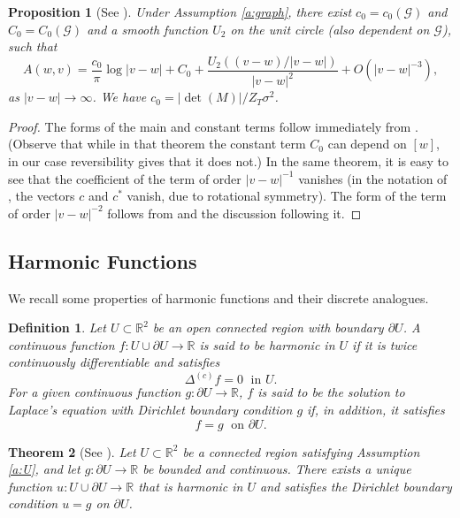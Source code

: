 \documentclass[11pt]{article}
\newtheorem{theorem}{Theorem}[section]
\newtheorem{proposition}[theorem]{Proposition}
\newtheorem{definition}{Definition}[section]
\theoremstyle{remark}
\def\cG{\mathcal{G}}
\newcommand{\eqnst}[1]{\begin{equation*}#1\end{equation*}}
\begin{document}
\begin{proposition}[{See \cite[Eqn.~(15)]{KU08}}]
\label{prop:A-asymp}
Under Assumption \ref{a:graph}, there exist $c_0 = c_0(\cG)$ and $C_0 = C_0(\cG)$ 
and a smooth function $U_2$ on the unit circle (also dependent on $\cG$), such that 
\eqnst{
  A(w,v)
  = \frac{c_0}{\pi} \log |v - w| + C_0 + \frac{U_2((v - w)/|v - w|)}{|v - w|^2} 
    + O \left( |v - w|^{-3} \right), }
as $| v - w | \to \infty$. We have $c_0 = |\det(M)|/ Z_T \sigma^2$.
\end{proposition}

\begin{proof}
The forms of the main and constant terms follow immediately from \cite[Theorem 1.2]{KU08}.
(Observe that while in that theorem the constant term $C_0$ can depend on $[w]$, in our case reversibility
gives that it does not.)
In the same theorem,
it is easy to see that the coefficient of the term of order $|v - w|^{-1}$ vanishes (in the notation of
\cite{KU08}, the vectors $c$ and $c^*$ vanish, due to rotational symmetry). The form of the term of order
$|v - w|^{-2}$ follows from \cite[Eqn.~(15)]{KU08} and the discussion following it.
\end{proof}


\subsection{Harmonic Functions}
\label{ssec:harmonic}

We recall some properties of harmonic functions and their discrete analogues. 

\begin{definition}
\label{def2_1}
    Let $U\subset\mathbb{R}^2$ be an open connected region with boundary \(\partial U\). A continuous function \(f : U\cup\partial U \rightarrow \mathbb{R}\) is said to be \it{harmonic} in \(U\) if it is twice continuously differentiable and satisfies 
    \[
        \Delta^{(c)} f = 0 \; \text{ in } U.
    \]
    For a given continuous function \(g : \partial U \rightarrow \mathbb{R}\), \(f\) is said to be the solution to Laplace's equation with Dirichlet boundary condition \(g\) if, in addition, it satisfies
    \[
        f = g \; \text{ on } \partial U.
    \]
\end{definition}

\begin{theorem}[{See \cite[Corollary 10.4.17]{Conway-book-I}}]
\label{thm2_1}
Let $U \subset\mathbb{R}^2$ be a connected region satisfying Assumption \ref{a:U},
and let \(g : \partial U \rightarrow \mathbb{R}\) be bounded and continuous.
There exists a unique function \(u : U\cup\partial U \rightarrow \mathbb{R}\) that 
is harmonic in \(U\) and satisfies the Dirichlet boundary condition \(u = g\) 
on \(\partial U\). 
\end{theorem}
\end{document}
